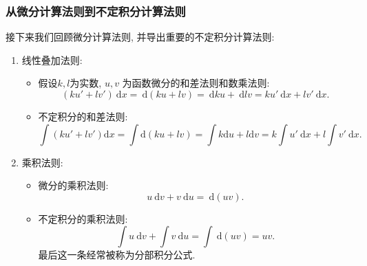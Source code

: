 \documentclass[
10pt,
aspectratio=43,
]{beamer}
\begin{document}
\begin{frame}
	\frametitle{从微分计算法则到不定积分计算法则}
	接下来我们回顾微分计算法则, 并导出重要的不定积分计算法则:\pause
	\begin{block}{}
		\begin{enumerate}
			\item 线性叠加法则:
			      \begin{itemize}
				      \item \pause 假设$k, l$为实数, $u, v$ 为函数微分的和差法则和数乘法则:
				            $$
					            (ku'+lv')\mathrm{~d}x=\mathrm{~d}(ku+ lv) = \mathrm{~d}ku + \mathrm{~d}lv=ku'\mathrm{~d}x+lv'\mathrm{~d}x.
				            $$
				      \item \pause 不定积分的和差法则:
				            $$
					            \int(ku'+lv')\mathrm{d}x=\int\mathrm{d}(ku+ lv) = \int k\mathrm{d}u + l\mathrm{d}v=k\int u'\mathrm{~d}x+l\int v'\mathrm{~d}x.
				            $$
			      \end{itemize}
			      \pause
			\item 乘积法则:
			      \begin{itemize}
				      \item \pause 微分的乘积法则:
				            $$
					            u\mathrm{~d}v+v\mathrm{~d}u =\mathrm{~d}(uv).
				            $$
				      \item \pause 不定积分的乘积法则:
				            $$
					            \int u\mathrm{~d}v+\int v\mathrm{~d}u=\int\mathrm{~d}(uv) = uv.
				            $$
				            \pause 最后这一条经常被称为分部积分公式.
			      \end{itemize}
		\end{enumerate}
	\end{block}
\end{frame}
\end{document}
